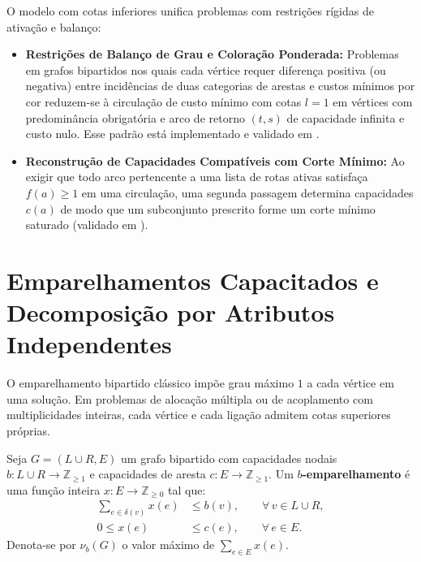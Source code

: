  O modelo com cotas inferiores unifica problemas com restrições rígidas de ativação e balanço:
\begin{itemize}
    \item \textbf{Restrições de Balanço de Grau e Coloração Ponderada:} Problemas em grafos bipartidos nos quais cada vértice requer diferença positiva (ou negativa) entre incidências de duas categorias de arestas e custos mínimos por cor reduzem-se à circulação de custo mínimo com cotas $l = 1$ em vértices com predominância obrigatória e arco de retorno $(t, s)$ de capacidade infinita e custo nulo. Esse padrão está implementado e validado em .
    \item \textbf{Reconstrução de Capacidades Compatíveis com Corte Mínimo:} Ao exigir que todo arco pertencente a uma lista de rotas ativas satisfaça $f(a) \ge 1$ em uma circulação, uma segunda passagem determina capacidades $c(a)$ de modo que um subconjunto prescrito forme um corte mínimo saturado (validado em ).
\end{itemize}


\section{Emparelhamentos Capacitados e Decomposição por Atributos Independentes}\label{sec:b_matching_decomp}

O emparelhamento bipartido clássico impõe grau máximo $1$ a cada vértice em uma solução. Em problemas de alocação múltipla ou de acoplamento com multiplicidades inteiras, cada vértice e cada ligação admitem cotas superiores próprias.

\begin{definicao}
Seja $G = (L \cup R, E)$ um grafo bipartido com capacidades nodais $b: L \cup R \to \mathbb{Z}_{\ge 1}$ e capacidades de aresta $c: E \to \mathbb{Z}_{\ge 1}$. Um \textbf{$b$-emparelhamento} é uma função inteira $x: E \to \mathbb{Z}_{\ge 0}$ tal que:
\begin{align}
    \sum_{e \in \delta(v)} x(e) &\le b(v), \qquad \forall\, v \in L \cup R, \\
    0 \le x(e) &\le c(e), \qquad \forall\, e \in E.
\end{align}
Denota-se por $\nu_b(G)$ o valor máximo de $\sum_{e \in E} x(e)$.
\end{definicao}

